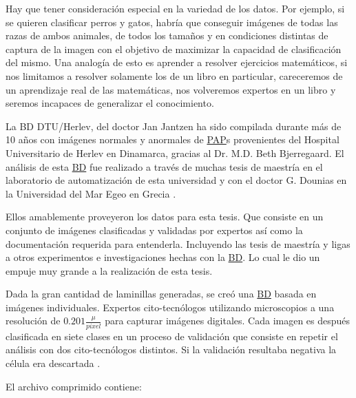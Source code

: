 Hay que tener consideración especial en la variedad de los datos. Por ejemplo,
si se quieren clasificar perros y gatos, habría que conseguir imágenes de todas
las razas de ambos animales, de todos los tamaños y en condiciones distintas de
captura de la imagen con el objetivo de maximizar la capacidad de clasificación
del mismo. Una analogía de esto es aprender a resolver ejercicios matemáticos,
si nos limitamos a resolver solamente los de un libro en particular, careceremos
de un aprendizaje real de las matemáticas, nos volveremos expertos en un libro y
seremos incapaces de generalizar el conocimiento.

La BD DTU/Herlev, del doctor Jan Jantzen ha sido compilada durante más de 10
años con imágenes normales y anormales de \hyperlink{abbr}{PAP}s provenientes
del Hospital Universitario de Herlev en Dinamarca, gracias al Dr. M.D. Beth
Bjerregaard. El análisis de esta \hyperlink{abbr}{BD} fue realizado a través de
muchas tesis de maestría en el laboratorio de automatización de esta universidad
y con el doctor G. Dounias en la Universidad del Mar Egeo en Grecia
\cite{MBE-LAB} \cite{Jantzen2005}. 

Ellos amablemente proveyeron los datos para esta tesis. Que consiste en un
conjunto de imágenes clasificadas y validadas por expertos así como la
documentación requerida para entenderla. Incluyendo las tesis de maestría y
ligas a otros experimentos e investigaciones hechas con la \hyperlink{abbr}{BD}.
Lo cual le dio un empuje muy grande a la realización de esta tesis.

Dada la gran cantidad de laminillas generadas, se creó una \hyperlink{abbr}{BD}
basada en imágenes individuales. Expertos cito-tecnólogos utilizando
microscopios a una resolución de $0.201  \frac{\mu}{pixel}$ para capturar imágenes
digitales. Cada imagen es después clasificada en siete clases en un proceso de
validación que consiste en repetir el análisis con dos cito-tecnólogos
distintos. Si la validación resultaba negativa la célula era descartada
\cite{Norup2005} \cite{Martin2003}. 

El archivo comprimido contiene:

